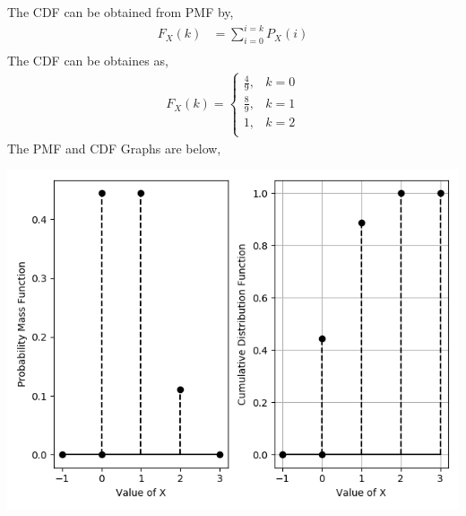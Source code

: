 \documentclass[journal,12pt,twocolumn]{IEEEtran}\usepackage[margin=1.25 in]{geometry}
\providecommand{\p}[1]{\ensuremath{{P_X}\left(#1\right)}}
\providecommand{\f}[1]{\ensuremath{{F_X}\left(#1\right)}}
\begin{document}
\noindent The CDF can be obtained from PMF by,
	\begin{align*}
	\f k & = \sum_{i = 0}^{i = k}\p i\\
	\end{align*}
\noindent The CDF can be obtaines as,
	\begin{align*}
	\f k = 
		\begin{cases}
			\frac{4}{9}, & k = 0\\
			\frac{8}{9}, & k = 1\\
			1, & k = 2\\			
		\end{cases}
	\end{align*}
\noindent The PMF and CDF Graphs are below,
\begin{center}
		\includegraphics[width = \columnwidth]{figs/f1.png}
	\end{center}
\end{document}
